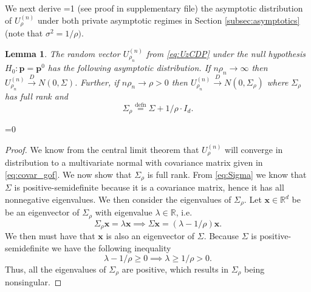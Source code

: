\documentclass[twoside,letterpaper]{article} \usepackage{aistats2017}
\newtheorem{lemma}[theorem]{Lemma}
\theoremstyle{definition}
\theoremstyle{remark}
\begin{document}
We next derive =1 (see proof in supplementary file) \fi the asymptotic distribution of ${U^{(n)}_{{\rho}}}$ under both private asymptotic regimes in Section \ref{subsec:asymptotics} (note that $\sigma^2=1/\rho)$.
\begin{lemma}\label{lem:dist_gof}
The random vector ${U^{(n)}_{{\rho_n}}}$ from \eqref{eq:UzCDP} under the null hypothesis $H_0: {\mathbf{p}} = {{\mathbf{p}}^0}$ has the following asymptotic distribution. If $n\rho_n \to \infty$ then ${U^{(n)}_{{\rho_n}}} \stackrel{D}{\to} N(0,{\Sigma})$.  Further, if $n \rho_n \to \rho>0$ then ${U^{(n)}_{{\rho_n}}} \stackrel{D}{\to} N(0,{{\Sigma}_{{\rho}}})$ where ${{\Sigma}_{{\rho}}}$  has full rank and 
\begin{equation}
{{\Sigma}_{{\rho}}} \stackrel{\mathrm{defn}}{=} {\Sigma} + 1/\rho \cdot I_d.
\label{eq:covar_gof}
\end{equation}
\end{lemma}
=0
\begin{proof}
We know from the central limit theorem that ${U^{(n)}_{{\rho}}}$ will converge in distribution to a multivariate normal with covariance matrix given in \eqref{eq:covar_gof}.  We now show that ${{\Sigma}_{{\rho}}}$ is full rank.  From \eqref{eq:Sigma} we know that $\Sigma$ is positive-semidefinite because it is a covariance matrix, hence it has all nonnegative eigenvalues.  We then consider the eigenvalues of ${{\Sigma}_{{\rho}}}$. Let ${\mathbf{x}} \in {\mathbb{R}}^d$ be be an eigenvector of ${{\Sigma}_{{\rho}}}$ with eigenvalue $\lambda \in {\mathbb{R}}$, i.e.
$$
{{\Sigma}_{{\rho}}} {\mathbf{x}} = \lambda {\mathbf{x}} \implies  {\Sigma}{\mathbf{x}} = (\lambda - 1/\rho){\mathbf{x}}.
$$  
We then must have that ${\mathbf{x}}$ is also an eigenvector of $\Sigma$.  Because $\Sigma$ is positive-semidefinite we have the following inequality
$$
\lambda - 1/\rho \geq 0 \implies \lambda \geq 1/\rho>0.
$$
Thus, all the eigenvalues of ${{\Sigma}_{{\rho}}}$ are positive, which results in ${{\Sigma}_{{\rho}}}$ being nonsingular.
\end{proof}
\fi
\end{document}
